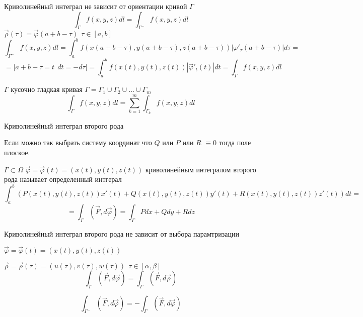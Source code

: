 \begin{theorem}
  Криволинейный интеграл не зависит от ориентации кривой $\Gamma$
  $$
  \int_{\Gamma} f(x,y,z) d l = \int_{\Gamma^-} f(x,y,z) d l
  $$
  $\vec \rho (\tau) = \vec \varphi (a+b-\tau) ~~ \tau \in [a,b]$
  $$
  \int_{\Gamma^-} f(x,y,z) d l = \int_a^b
  f(x(a+b-\tau),y(a+b-\tau),z(a+b-\tau)) |\varphi'_{\tau}(a+b-\tau)|d \tau =
  $$
  $$
  = |a+b-\tau=t ~~ dt = -d\tau| = \int_a^b f(x(t),y(t),z(t))
  |\vec \varphi'_t(t)| dt = \int_{\Gamma} f(x,y,z) dl
  $$
\end{theorem}

\begin{theorem}
  $\Gamma$ кусочно гладкая кривая $\Gamma = \Gamma_1 \cup \Gamma_2 \cup
  \ldots \cup \Gamma_m$
  $$
  \int_{\Gamma} f(x,y,z) d l = \sum_{k=1}^m \int_{\Gamma_k} f(x,y,z) d l
  $$
\end{theorem}

\begin{title}[\Large]
  Криволинейный интеграл второго рода
\end{title}

\begin{define}
  Если можно так выбрать систему координат что $Q$ или $P$ или $R$ $\equiv 0$
  тогда поле плоское.
\end{define}

\begin{define}
  $\Gamma \subset \Omega$ $\vec \varphi = \vec \varphi(t) = (x(t), y(t), z(t))$
  криволинейным интегралом второго рода называет определенный интгерал
  $$
  \int_a^b (P(x(t), y(t), z(t))x'(t) + Q (x(t), y(t), z(t))y'(t) +
  R(x(t), y(t), z(t))z'(t))dt =
  $$
  $$
  = \int_{\Gamma} (\vec F, d \vec \varphi) =
  \int_{\Gamma} Pdx + Qdy + Rdz
  $$
\end{define}

\begin{theorem}
  Криволинейный интеграл второго рода не зависит от выбора парамтризации

  $\vec \varphi = \vec \varphi(t) = (x(t), y(t), z(t))$

  $\vec \rho = \vec \rho(\tau) = (u(\tau), v(\tau), w(\tau)) ~~ \tau \in
  [\alpha, \beta]$
  $$
  \int_{\Gamma} (\vec F, d \vec \varphi) = \int_{\Gamma}(\vec F, d\vec \rho)
  $$
\end{theorem}

\begin{theorem}
  $$
  \int_{\Gamma^-} (\vec F, d\vec \varphi) = - \int_{\Gamma} (\vec F, d \vec
  \varphi)
  $$
\end{theorem}

